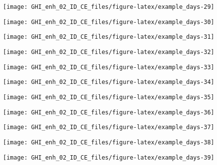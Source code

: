 \documentclass[
  10pt,
  a4paper,oneside]{article}
\begin{document}
\begin{center}\texttt{[image: GHI\_enh\_02\_ID\_CE\_files/figure-latex/example\_days-29]} \end{center}

\begin{center}\texttt{[image: GHI\_enh\_02\_ID\_CE\_files/figure-latex/example\_days-30]} \end{center}

\begin{center}\texttt{[image: GHI\_enh\_02\_ID\_CE\_files/figure-latex/example\_days-31]} \end{center}

\begin{center}\texttt{[image: GHI\_enh\_02\_ID\_CE\_files/figure-latex/example\_days-32]} \end{center}

\begin{center}\texttt{[image: GHI\_enh\_02\_ID\_CE\_files/figure-latex/example\_days-33]} \end{center}

\begin{center}\texttt{[image: GHI\_enh\_02\_ID\_CE\_files/figure-latex/example\_days-34]} \end{center}

\begin{center}\texttt{[image: GHI\_enh\_02\_ID\_CE\_files/figure-latex/example\_days-35]} \end{center}

\begin{center}\texttt{[image: GHI\_enh\_02\_ID\_CE\_files/figure-latex/example\_days-36]} \end{center}

\begin{center}\texttt{[image: GHI\_enh\_02\_ID\_CE\_files/figure-latex/example\_days-37]} \end{center}

\begin{center}\texttt{[image: GHI\_enh\_02\_ID\_CE\_files/figure-latex/example\_days-38]} \end{center}

\begin{center}\texttt{[image: GHI\_enh\_02\_ID\_CE\_files/figure-latex/example\_days-39]} \end{center}
\end{document}
